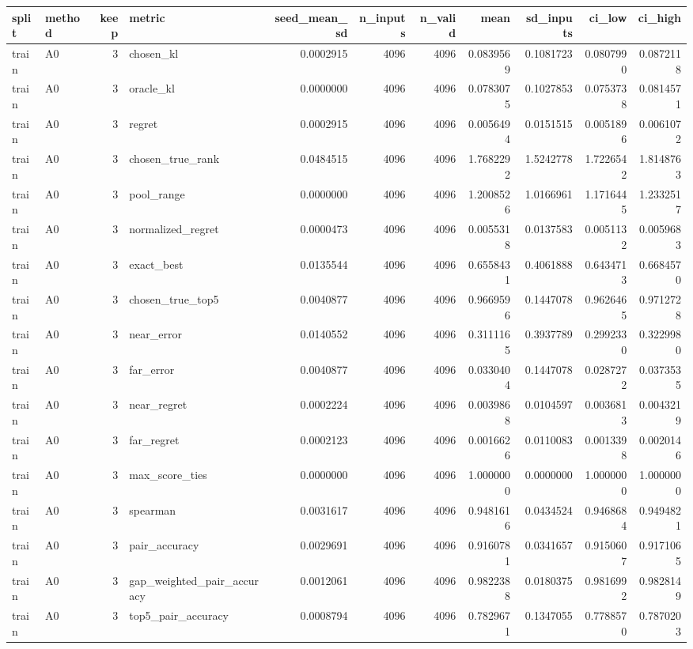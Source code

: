 \begin{tabular}{llrlrrrrrrr}
\toprule
split & method & keep & metric & seed_mean_sd & n_inputs & n_valid & mean & sd_inputs & ci_low & ci_high \\
\midrule
train & A0 & 3 & chosen_kl & 0.0002915 & 4096 & 4096 & 0.0839569 & 0.1081723 & 0.0807990 & 0.0872118 \\
train & A0 & 3 & oracle_kl & 0.0000000 & 4096 & 4096 & 0.0783075 & 0.1027853 & 0.0753738 & 0.0814571 \\
train & A0 & 3 & regret & 0.0002915 & 4096 & 4096 & 0.0056494 & 0.0151515 & 0.0051896 & 0.0061072 \\
train & A0 & 3 & chosen_true_rank & 0.0484515 & 4096 & 4096 & 1.7682292 & 1.5242778 & 1.7226542 & 1.8148763 \\
train & A0 & 3 & pool_range & 0.0000000 & 4096 & 4096 & 1.2008526 & 1.0166961 & 1.1716445 & 1.2332517 \\
train & A0 & 3 & normalized_regret & 0.0000473 & 4096 & 4096 & 0.0055318 & 0.0137583 & 0.0051132 & 0.0059683 \\
train & A0 & 3 & exact_best & 0.0135544 & 4096 & 4096 & 0.6558431 & 0.4061888 & 0.6434713 & 0.6684570 \\
train & A0 & 3 & chosen_true_top5 & 0.0040877 & 4096 & 4096 & 0.9669596 & 0.1447078 & 0.9626465 & 0.9712728 \\
train & A0 & 3 & near_error & 0.0140552 & 4096 & 4096 & 0.3111165 & 0.3937789 & 0.2992330 & 0.3229980 \\
train & A0 & 3 & far_error & 0.0040877 & 4096 & 4096 & 0.0330404 & 0.1447078 & 0.0287272 & 0.0373535 \\
train & A0 & 3 & near_regret & 0.0002224 & 4096 & 4096 & 0.0039868 & 0.0104597 & 0.0036813 & 0.0043219 \\
train & A0 & 3 & far_regret & 0.0002123 & 4096 & 4096 & 0.0016626 & 0.0110083 & 0.0013398 & 0.0020146 \\
train & A0 & 3 & max_score_ties & 0.0000000 & 4096 & 4096 & 1.0000000 & 0.0000000 & 1.0000000 & 1.0000000 \\
train & A0 & 3 & spearman & 0.0031617 & 4096 & 4096 & 0.9481616 & 0.0434524 & 0.9468684 & 0.9494821 \\
train & A0 & 3 & pair_accuracy & 0.0029691 & 4096 & 4096 & 0.9160781 & 0.0341657 & 0.9150607 & 0.9171065 \\
train & A0 & 3 & gap_weighted_pair_accuracy & 0.0012061 & 4096 & 4096 & 0.9822388 & 0.0180375 & 0.9816992 & 0.9828149 \\
train & A0 & 3 & top5_pair_accuracy & 0.0008794 & 4096 & 4096 & 0.7829671 & 0.1347055 & 0.7788570 & 0.7870203 \\

\end{tabular}
